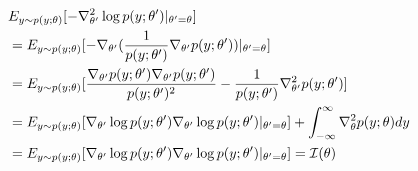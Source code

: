 \begin{answer}
    $$
    \begin{aligned}
&E_{y\sim p(y;\theta)}[ - \nabla^2_{\theta'}\log p(y;\theta')|_{\theta' = \theta}]\\
&=E_{y\sim p(y;\theta)}[-\nabla_{\theta'}(\frac{1}{p(y;\theta') }\nabla_{\theta' }p(y;\theta'))|_{\theta' = \theta}]\\
&= E_{y\sim p(y;\theta)}[\frac{\nabla_{\theta'}p(y;\theta')\nabla_{\theta'}p(y;\theta')}{p(y;\theta')^2} - \frac{1}{p(y;\theta')}\nabla_{\theta'}^2 p(y;\theta')]\\
&= E_{y\sim p(y;\theta)}[\nabla_{\theta'}\log p(y;\theta')\nabla_{\theta'}\log p(y;\theta')|_{\theta' = \theta}] + \int_{-\infty}^{\infty}\nabla_{\theta}^2 p(y;\theta) dy\\
&= E_{y\sim p(y;\theta)}[\nabla_{\theta'}\log p(y;\theta')\nabla_{\theta'}\log p(y;\theta')|_{\theta' = \theta}] = \cal I(\theta)
\end{aligned}
$$
\end{answer}
